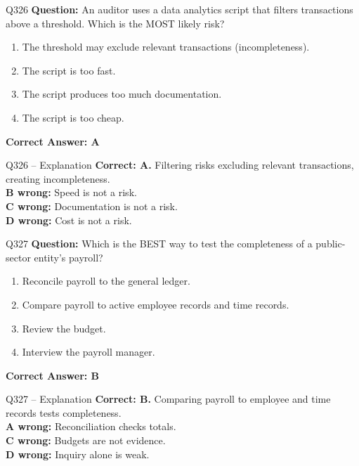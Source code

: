 \documentclass[aspectratio=169,10pt]{beamer}
\begin{document}
	\begin{frame}[t]{Q326}
		\small
		\textbf{Question:} An auditor uses a data analytics script that filters transactions above a threshold. Which is the MOST likely risk?
		\begin{enumerate}[label=\Alph*.,itemsep=1pt,topsep=2pt]
			\item The threshold may exclude relevant transactions (incompleteness).
			\item The script is too fast.
			\item The script produces too much documentation.
			\item The script is too cheap.
		\end{enumerate}
		\vspace{4pt}
		\textbf{Correct Answer: A}
	\end{frame}
	
	\begin{frame}[t]{Q326 -- Explanation}
		\small
		\textbf{Correct: A.} Filtering risks excluding relevant transactions, creating incompleteness. \\[4pt]
		\textbf{B wrong:} Speed is not a risk. \\[2pt]
		\textbf{C wrong:} Documentation is not a risk. \\[2pt]
		\textbf{D wrong:} Cost is not a risk.
	\end{frame}
	
	\begin{frame}[t]{Q327}
		\small
		\textbf{Question:} Which is the BEST way to test the completeness of a public-sector entity's payroll?
		\begin{enumerate}[label=\Alph*.,itemsep=1pt,topsep=2pt]
			\item Reconcile payroll to the general ledger.
			\item Compare payroll to active employee records and time records.
			\item Review the budget.
			\item Interview the payroll manager.
		\end{enumerate}
		\vspace{4pt}
		\textbf{Correct Answer: B}
	\end{frame}
	
	\begin{frame}[t]{Q327 -- Explanation}
		\small
		\textbf{Correct: B.} Comparing payroll to employee and time records tests completeness. \\[4pt]
		\textbf{A wrong:} Reconciliation checks totals. \\[2pt]
		\textbf{C wrong:} Budgets are not evidence. \\[2pt]
		\textbf{D wrong:} Inquiry alone is weak.
	\end{frame}
	
\end{document}
